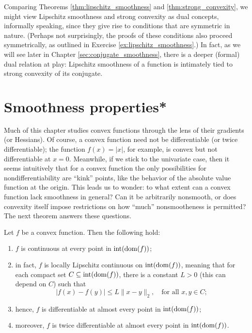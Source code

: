 Comparing Theorems \ref{thm:lipschitz_smoothness} and
\ref{thm:strong_convexity}, we might view Lipschitz smoothness and strong
convexity as dual concepts, informally speaking, since they give rise to
conditions that are symmetric in nature. (Perhaps not surprisingly, the proofs
of these conditions also proceed symmetrically, as outlined in Exercise
\ref{ex:lipschitz_smoothness}.)  In fact, as we will see later in Chapter 
\ref{sec:conjugate_smoothness}, there is a deeper (formal) dual relation at
play: Lipschitz smoothness of a function is intimately tied to strong convexity
of its conjugate.

\section{Smoothness properties*}

Much of this chapter studies convex functions through the lens of their
gradients (or Hessians). Of course, a convex function need not be differentiable
(or twice differentiable); the function $f(x) = |x|$, for example, is convex but
not differentiable at $x=0$. Meanwhile, if we stick to the univariate case,
then it seems intuitively that for a convex function the only possibilities for 
nondifferentiability are ``kink'' points, like the behavior of the absolute
value function at the origin. This leads us to wonder: to what extent can a
convex function lack smoothness in general? Can it be arbitrarily nonsmooth, or 
does convexity itself impose restrictions on how ``much'' nonsmootheness is
permitted? The next theorem answers these questions.

\begin{Theorem} 
\label{thm:smoothness_properties}
Let $f$ be a convex function. Then the following hold: 
\begin{enumerate}[label=(\roman*)]
\item $f$ is continuous at every point in $\operatorname{int}(\operatorname{dom}(f))$;
\item in fact, $f$ is locally Lipschitz continuous on $\operatorname{int}(\operatorname{dom}(f))$,
  meaning that for each compact set $C \subseteq \operatorname{int}(\operatorname{dom}(f))$, there
  is a constant $L>0$ (this can depend on $C$) such that        
  \[
  |f(x) - f(y)| \leq L \|x-y\|_2, \quad \text{for all $x,y \in C$};
  \]
\item hence, $f$ is differentiable at almost every point in
  $\operatorname{int}(\operatorname{dom}(f))$;   
\item moreover, $f$ is twice differentiable at almost every point in 
  $\operatorname{int}(\operatorname{dom}(f))$.  
\end{enumerate}
\end{Theorem}

